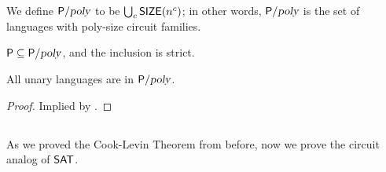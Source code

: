 \begin{definition}
We define ${\mathsf{P}}/{\textsl{poly}}$ to be $\bigcup_{c} {\mathsf{SIZE}}(n^c)$; in other words, ${\mathsf{P}}/{\textsl{poly}}$ is the set of languages with poly-size circuit families.
\end{definition}

\begin{theorem}
${\mathsf{P}} \subseteq {\ensuremath{\mathsf{P}}}/{\textsl{poly}}$, and the inclusion is strict.
\end{theorem}


\begin{theorem}
All unary languages are in ${\mathsf{P}}/{\textsl{poly}}$.
\end{theorem}

\begin{proof}
Implied by .
\end{proof}

\subsection{}
As we proved the Cook-Levin Theorem from before, now we prove the circuit analog of ${\mathsf{SAT}}$. 